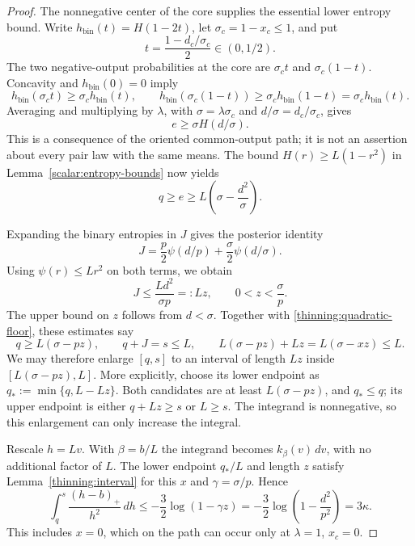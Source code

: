\begin{proof}
The nonnegative center of the core supplies the essential lower
entropy bound.  Write $h_{\mathrm{bin}}(t)=H(1-2t)$, let
$\sigma_c=1-x_c\le1$, and put
\[
 t=\frac{1-d_c/\sigma_c}{2}\in(0,1/2).
\]
The two negative-output probabilities at the core are
$\sigma_c t$ and $\sigma_c(1-t)$.  Concavity and
$h_{\mathrm{bin}}(0)=0$ imply
\[
 h_{\mathrm{bin}}(\sigma_c t)\ge\sigma_c h_{\mathrm{bin}}(t),\qquad
 h_{\mathrm{bin}}(\sigma_c(1-t))
 \ge\sigma_c h_{\mathrm{bin}}(1-t)=\sigma_c h_{\mathrm{bin}}(t).
\]
Averaging and multiplying by $\lambda$, with
$\sigma=\lambda\sigma_c$ and $d/\sigma=d_c/\sigma_c$, gives
\begin{equation}
\label{thinning:entropy-floor}
 e\ge\sigma H(d/\sigma).
\end{equation}
This is a consequence of the oriented common-output path; it is not
an assertion about every pair law with the same means.
The bound $H(r)\ge L(1-r^2)$ in
Lemma~\ref{scalar:entropy-bounds} now yields
\begin{equation}
\label{thinning:quadratic-floor}
 q\ge e\ge L\left(\sigma-\frac{d^2}{\sigma}\right).
\end{equation}

Expanding the binary entropies in $J$ gives the posterior identity
\[
 J=\frac p2\psi(d/p)+\frac\sigma2\psi(d/\sigma).
\]
Using $\psi(r)\le Lr^2$ on both terms, we obtain
\[
 J\le\frac{Ld^2}{\sigma p}=:Lz,\qquad
 0<z<\frac\sigma p.
\]
The upper bound on $z$ follows from $d<\sigma$.  Together with
\eqref{thinning:quadratic-floor}, these estimates say
\[
 q\ge L(\sigma-pz),\qquad q+J=s\le L,
 \qquad L(\sigma-pz)+Lz=L(\sigma-xz)\le L.
\]
We may therefore enlarge $[q,s]$ to an interval of length $Lz$
inside $[L(\sigma-pz),L]$.  More explicitly, choose its lower
endpoint as $q_*:=\min\{q,L-Lz\}$.  Both candidates are at least
$L(\sigma-pz)$, and $q_*\le q$; its upper endpoint is either
$q+Lz\ge s$ or $L\ge s$.  The integrand is nonnegative, so this
enlargement can only increase the integral.

Rescale $h=Lv$.  With $\beta=b/L$ the integrand becomes
$k_\beta(v)\,dv$, with no additional factor of $L$.  The lower
endpoint $q_*/L$ and length $z$ satisfy
Lemma~\ref{thinning:interval} for this $x$ and
$\gamma=\sigma/p$.  Hence
\[
 \int_q^s\frac{(h-b)_+}{h^2}\,dh
 \le-\frac32\log(1-\gamma z)
 =-\frac32\log\left(1-\frac{d^2}{p^2}\right)
 =3\kappa.
\]
This includes $x=0$, which on the path can occur only at
$\lambda=1$, $x_c=0$.
\end{proof}

